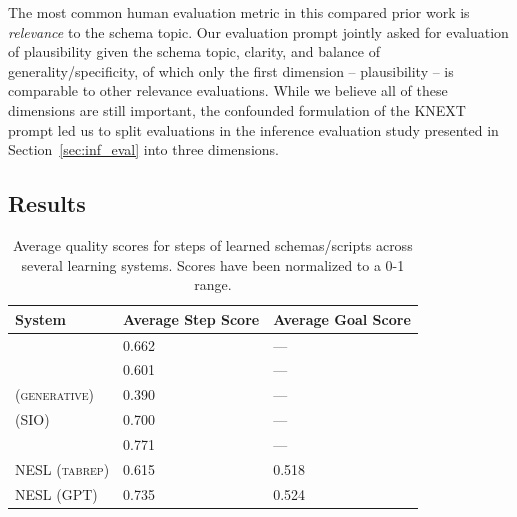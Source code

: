 The most common human evaluation metric in this compared prior work is \textit{relevance} to the schema topic. Our evaluation prompt jointly asked for evaluation of plausibility given the schema topic, clarity, and balance of generality/specificity, of which only the first dimension -- plausibility -- is comparable to other relevance evaluations. While we believe all of these dimensions are still important, the confounded formulation of the KNEXT prompt led us to split evaluations in the inference evaluation study presented in Section~\ref{sec:inf_eval} into three dimensions.

\subsection{Results}
\begin{table}[ht]
    \centering
    \begin{tabular}{l|l|l}
       \textbf{System} & \textbf{Average Step Score} & \textbf{Average Goal Score} \\
       \hline
       \citet{pichotta2016learning} & 0.662 & --- \\
       \citet{weber_causal_scripts} & 0.601 & --- \\
       \citet{goal-oriented-scripts} \textsc{(generative)} & 0.390 & --- \\
       \citet{goal-oriented-scripts} \textsc{(SIO)} & 0.700 & --- \\
       \citet{starsem-scripts} & 0.771 & --- \\
       \textsc{NESL (tabrep)} & 0.615 & 0.518 \\
       \textsc{NESL (GPT)} & 0.735 & 0.524 \\
    \end{tabular}
    \caption{Average quality scores for steps of learned schemas/scripts across several learning systems. Scores have been normalized to a 0-1 range.}
    \label{tab:schema_results}
\end{table}
